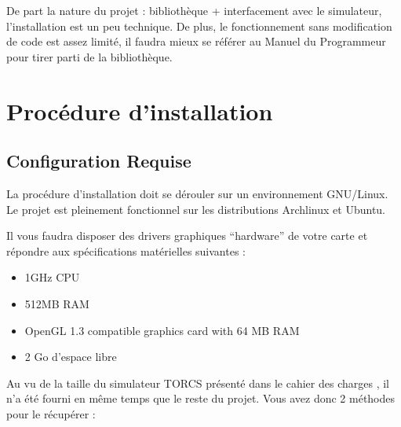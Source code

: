 \documentclass[a4paper,12pt]{article}
\begin{document}
  \begin{titlepage}
   \def\titletype{Manuel de l’utilisateur}
   
  \end{titlepage}

  
  \clearpage

  \tableofcontents
  

  \clearpage
  
  \renewcommand{\labelitemi}{$\bullet$}
  \renewcommand{\labelitemii}{$\circ$}
  \renewcommand{\labelitemiii}{$\diamond$}
  \renewcommand{\labelitemiv}{$\ast$}
  
  
  De part la nature du projet : bibliothèque + interfacement avec le simulateur, l'installation est un peu technique.
  De plus, le fonctionnement sans modification de code est assez limité, il faudra mieux se référer au 
  Manuel du Programmeur pour tirer parti de la bibliothèque.
  
  \section{Procédure d’installation}

  \subsection{Configuration Requise}
  La procédure d'installation doit se dérouler sur un environnement GNU/Linux.
  Le projet est pleinement fonctionnel sur les distributions Archlinux et Ubuntu.
 
  Il vous faudra disposer des drivers graphiques ``hardware'' de votre carte et répondre aux spécifications
  matérielles suivantes :
   \begin{itemize}
    \item 1GHz CPU
    \item 512MB RAM
    \item OpenGL 1.3 compatible graphics card with 64 MB RAM
    \item 2 Go d'espace libre
   \end{itemize}
 
 Au vu de la taille du simulateur TORCS \cite{TORCS} présenté
  dans le cahier des charges \cite{CdC}, il n'a été fourni en même temps que le reste du projet.
 Vous avez donc 2 méthodes pour le récupérer : 
\end{document}
